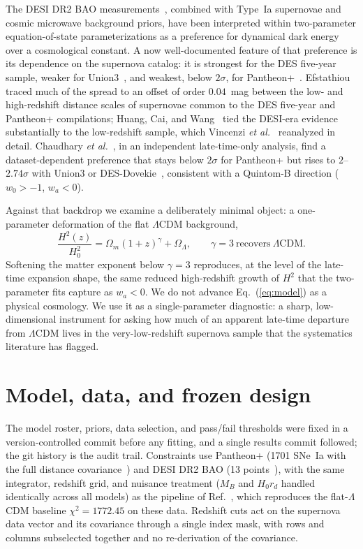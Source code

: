 \documentclass[
  aps,
  prd,
  reprint,           %
  nofootinbib,
  longbibliography
]{revtex4-2}
\begin{document}
The DESI DR2 BAO measurements~\cite{DESI}, combined with Type~Ia
supernovae and cosmic microwave background priors, have been interpreted
within two-parameter equation-of-state parameterizations as a preference
for dynamical dark energy over a cosmological constant. A now
well-documented feature of that preference is its dependence on the
supernova catalog: it is strongest for the DES five-year sample, weaker
for Union3~\cite{Rubin}, and weakest, below $2\sigma$, for
Pantheon+~\cite{Brout}. Efstathiou~\cite{Efst} traced much of the spread
to an offset of order $0.04$~mag between the low- and high-redshift
distance scales of supernovae common to the DES five-year and Pantheon+
compilations; Huang, Cai, and Wang~\cite{Huang} tied the DESI-era evidence
substantially to the low-redshift sample, which Vincenzi \textit{et
al.}~\cite{Vincenzi} reanalyzed in detail. Chaudhary \textit{et
al.}~\cite{Chaud}, in an independent late-time-only analysis, find a
dataset-dependent preference that stays below $2\sigma$ for Pantheon+ but
rises to $2$--$2.74\sigma$ with Union3 or DES-Dovekie~\cite{Dovekie},
consistent with a Quintom-B direction ($w_0 > -1$, $w_a < 0$).

Against that backdrop we examine a deliberately minimal object: a
one-parameter deformation of the flat $\Lambda$CDM background,
\begin{equation}
\frac{H^2(z)}{H_0^2} = \Omega_m (1+z)^{\gamma} + \Omega_\Lambda,
\qquad \gamma = 3 \ \text{recovers} \ \Lambda\text{CDM}.
\label{eq:model}
\end{equation}
Softening the matter exponent below $\gamma = 3$ reproduces, at the level
of the late-time expansion shape, the same reduced high-redshift growth of
$H^2$ that the two-parameter fits capture as $w_a < 0$. We do not advance
Eq.~(\ref{eq:model}) as a physical cosmology. We use it as a
single-parameter diagnostic: a sharp, low-dimensional instrument for
asking how much of an apparent late-time departure from $\Lambda$CDM lives
in the very-low-redshift supernova sample that the systematics literature
has flagged.

\section{Model, data, and frozen design}\label{sec:design}

The model roster, priors, data selection, and pass/fail thresholds were
fixed in a version-controlled commit before any fitting, and a single
results commit followed; the git history is the audit trail. Constraints
use Pantheon+ (1701 SNe~Ia with the full distance covariance~\cite{Brout})
and DESI DR2 BAO (13 points~\cite{DESI}), with the same integrator,
redshift grid, and nuisance treatment ($M_B$ and $H_0 r_d$ handled
identically across all models) as the pipeline of Ref.~\cite{Pipeline},
which reproduces the flat-$\Lambda$CDM baseline $\chi^2 = 1772.45$ on
these data. Redshift cuts act on the supernova data vector and its
covariance through a single index mask, with rows and columns subselected
together and no re-derivation of the covariance.
\end{document}
